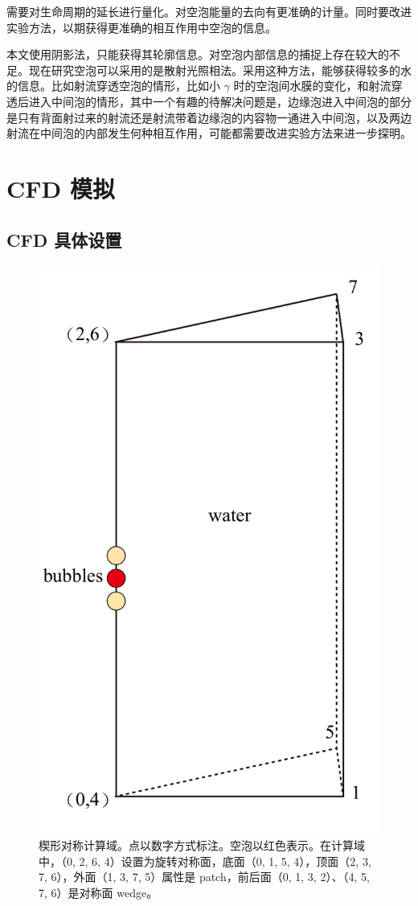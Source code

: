 需要对生命周期的延长进行量化。对空泡能量的去向有更准确的计量。同时要改进实验方法，以期获得更准确的相互作用中空泡的信息。

本文使用阴影法，只能获得其轮廓信息。对空泡内部信息的捕捉上存在较大的不足。现在研究空泡可以采用的是散射光照相法。采用这种方法，能够获得较多的水的信息。比如射流穿透空泡的情形，比如小
$\gamma$
时的空泡间水膜的变化，和射流穿透后进入中间泡的情形，其中一个有趣的待解决问题是，边缘泡进入中间泡的部分是只有背面射过来的射流还是射流带着边缘泡的内容物一通进入中间泡，以及两边射流在中间泡的内部发生何种相互作用，可能都需要改进实验方法来进一步探明。

\section{CFD 模拟}

\subsection{CFD 具体设置}

\begin{figure}[H]
    \centering
    \includegraphics[width=0.45\linewidth]{img/fig4.14.pdf}
    \caption[楔形对称计算域。]{楔形对称计算域。点以数字方式标注。空泡以红色表示。在计算域中，（0,
2, 6, 4）设置为旋转对称面，底面（0, 1, 5, 4），顶面（2, 3, 7,
6），外面（1, 3, 7, 5）属性是 patch，前后面（0, 1, 3, 2）、（4, 5, 7,
6）是对称面 wedge。}
    \label{fig:4.14}
\end{figure}

